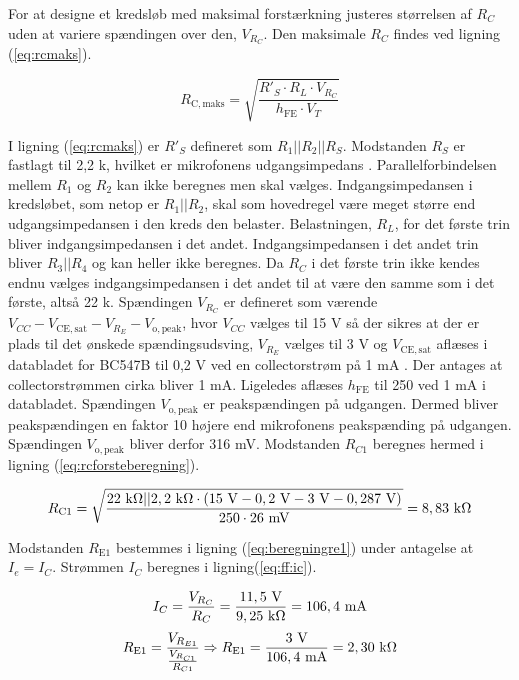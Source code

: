 For at designe et kredsløb med maksimal forstærkning justeres størrelsen af $R_C$ uden at variere spændingen over den, $V_{R_C}$. Den maksimale $R_C$ findes ved ligning (\ref{eq:rcmaks}).

\begin{equation}
R_{\mathrm{C,maks}} = \sqrt{\frac{R'_S \cdot R_L \cdot V_{R_C}}{h_\mathrm{FE} \cdot V_T}}
\label{eq:rcmaks}
\end{equation}

I ligning (\ref{eq:rcmaks}) er $R'_S$ defineret som $R_1||R_2||R_S$. Modstanden $R_S$ er fastlagt til 2,2 k\ohm, hvilket er mikrofonens udgangsimpedans \cite{mic-datablad}. Parallelforbindelsen mellem $R_1$ og $R_2$ kan ikke beregnes men skal vælges. Indgangsimpedansen i kredsløbet, som netop er $R_1||R_2$, skal som hovedregel være meget større end udgangsimpedansen i den kreds den belaster. Belastningen, $R_L$, for det første trin bliver indgangsimpedansen i det andet. Indgangsimpedansen i det andet trin bliver $R_3||R_4$ og kan heller ikke beregnes. Da $R_C$ i det første trin ikke kendes endnu vælges indgangsimpedansen i det andet til at være den samme som i det første, altså 22 k\ohm. 
Spændingen $V_{R_C}$ er defineret som værende $V_{CC} - V_{\mathrm{CE,sat}} - V_{R_E} - V_{\mathrm{o,peak}}$, hvor $V_{CC}$ vælges til 15 V så der sikres at der er plads til det ønskede spændingsudsving, $V_{R_E}$ vælges til 3 V og $V_{\mathrm{CE,sat}}$ aflæses i databladet for BC547B  til 0,2 V ved en collectorstrøm på 1 mA \cite{bc547b-datablad}. Der antages at collectorstrømmen cirka bliver 1 mA. Ligeledes aflæses $h_\mathrm{FE}$ til 250 ved 1 mA i databladet. Spændingen $V_{\mathrm{o,peak}}$ er peakspændingen på udgangen. Dermed bliver peakspændingen en faktor 10 højere end mikrofonens peakspænding på udgangen. Spændingen $V_{\mathrm{o,peak}}$ bliver derfor 316 mV. Modstanden $R_{C1}$ beregnes hermed i ligning (\ref{eq:rcforsteberegning}).

\begin{equation}
R_{\mathrm{C1}} = \sqrt{\frac{22~\mathrm{k}\ohm || 2,2~\mathrm{k}\ohm \cdot (15~\mathrm{V} - 0,2~\mathrm{V} - 3~\mathrm{V} - 0,287~\mathrm{V})}{250 \cdot 26~\mathrm{mV}}}=8,83~\mathrm{k}\ohm
\label{eq:rcforsteberegning}
\end{equation}

Modstanden $R_{\mathrm{E1}}$ bestemmes i ligning (\ref{eq:beregningre1}) under antagelse at $I_e = I_C$.  Strømmen $I_C$ beregnes i ligning(\ref{eq:ff:ic}).

\begin{equation}
\label{eq:ff:ic}
I_C=\frac{V_{R_C}}{R_C}=\frac{11,5~\mathrm{V}}{9,25~\mathrm{k}\ohm}=106,4~\mathrm{mA}
\end{equation}
\begin{equation}
R_{\mathrm{E1}}=\frac{V_{R_{E1}}}{\frac{V_{R_{C1}}}{R_{C1}}}  \Rightarrow R_{\mathrm{E1}}=\frac{3~\mathrm{V}}{106,4~\mathrm{mA}}=2,30~\mathrm{k}\ohm
\label{eq:beregningre1}
\end{equation}


